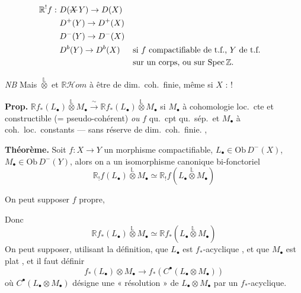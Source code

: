 \documentclass[11pt,a4paper]{article}
\begin{document}
\begin{align*}
  \mathbb{R}^{!}f :\ & D(\text{\struck{$X$}}\, Y) \to D(X) \\
  & D^{+}(Y) \to D^{+}(X) \\
  & D^{-}(Y) \to D^{-}(X) \\
  & D^{b}(Y) \to D^{b}(X)
  && \text{si $f$ compactifiable de t.f., $Y$ de t.f.}\\
  &&& \text{sur un corps, ou sur $\mathrm{Spec}\, \mathbb{Z}$.}
\end{align*}

\emph{NB} Mais $\overset{\mathbb{L}}{\otimes}$ et $\mathbb{R}\mathcal{H}om$ \ill{} \ill{}  \ill{} \ill{} à être de dim.\ coh.\ finie, même si $X$  : \ill{} \ill{} \ill{} !

\textbf{Prop.} $\mathbb{R}f_{*}(L_{\bullet}) \overset{\mathbb{L}}{\otimes} M_{\bullet} \xrightarrow{\ \sim\ } \mathbb{R}f_{*}(L_{\bullet}) \overset{\mathbb{L}}{\otimes} M_{\bullet}$ si $M_{\bullet}$ à cohomologie loc.\ cte et constructible (=  pseudo-cohérent) \emph{ou} $f$ qu.\ cpt qu.\ sép.\ et $M_{\bullet}$ à coh.\ loc.\ constants — sans réserve de dim.\ coh.\ finie. \ill{} \ill{}, \ill{}

\textbf{Théorème.} Soit $f : X \to Y$ un morphisme  compactifiable, $L_{\bullet} \in \mathrm{Ob}\, D^{-}(X)$, $M_{\bullet} \in \mathrm{Ob}\, D^{-}(Y)$, alors on a un isomorphisme canonique bi-fonctoriel
\[
  \mathbb{R}_{!}f(L_{\bullet}) \overset{\mathbb{L}}{\otimes} M_{\bullet}
  \simeq \mathbb{R}_{!}f(L_{\bullet} \overset{\mathbb{L}}{\otimes} M_{\bullet})
\]

On peut supposer $f$ propre, \struck{\ill{}} \ill{}

 Donc
\[
  \mathbb{R}f_{*}(L_{\bullet}) \overset{\mathbb{L}}{\otimes} M_{\bullet}
  \simeq \mathbb{R}f_{*}(L_{\bullet} \overset{\mathbb{L}}{\otimes} M_{\bullet})
\]
On peut supposer, utilisant la définition, que $L_{\bullet}$ est $f_{*}$-acyclique  , et que $M_{\bullet}$ est plat  , et il faut définir
\[
  f_{*}(L_{\bullet}) \otimes M_{\bullet} \longrightarrow f_{*}(C^{\bullet}(L_{\bullet} \otimes M_{\bullet}))
\]
où $C^{\bullet}(L_{\bullet} \otimes M_{\bullet})$ désigne une « résolution » de $L_{\bullet} \otimes M_{\bullet}$ par un  $f_{*}$-acyclique.
\end{document}
